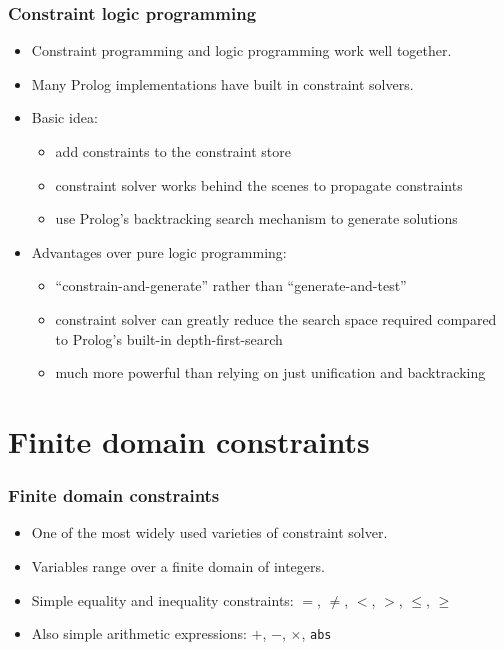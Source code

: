 \documentclass[aspectratio=169,hyphens]{beamer} %
\begin{document}
\begin{frame}
    \frametitle{Constraint logic programming}
    \begin{itemize}
        \item Constraint programming and logic programming work well together.
    \pause
        \item Many Prolog implementations have built in constraint solvers.
    \pause
        \item Basic idea:
            \begin{itemize}
                \item add constraints to the constraint store
    \pause
                \item constraint solver works behind the scenes to propagate constraints
    \pause
                \item use Prolog's backtracking search mechanism to generate solutions
    \pause
            \end{itemize}
        \item Advantages over pure logic programming:
            \begin{itemize}
                \item ``constrain-and-generate'' rather than ``generate-and-test''
    \pause
                \item constraint solver can greatly reduce the search space required compared to Prolog's built-in depth-first-search
    \pause
                \item much more powerful than relying on just unification and backtracking
            \end{itemize}
    \end{itemize}
\end{frame}

\section{Finite domain constraints}

\begin{frame}[fragile]
    \frametitle{Finite domain constraints}
\begin{itemize}
    \item One of the most widely used varieties of constraint solver.
        \pause
    \item Variables range over a finite domain of integers.
        \pause
    \item Simple equality and inequality constraints: $=$, $\neq$, $<$, $>$, $\leq$, $\geq$
        \pause
    \item Also simple arithmetic expressions: $+$, $-$, $\times$, \texttt{abs}
\end{itemize}
\end{frame}
\end{document}
